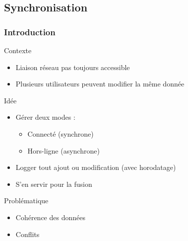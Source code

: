 \subsection{Synchronisation}

\begin{frame}
\tableofcontents[subsectionstyle=show/shaded/hide, sectionstyle=show/hide]
\end{frame}

\begin{frame}
\frametitle{Introduction}

\begin{block}{Contexte}
\begin{itemize}
    \item Liaison réseau pas toujours accessible
    \item Plusieurs utilisateurs peuvent modifier la même donnée
\end{itemize}
\end{block}

\pause

\begin{exampleblock}{Idée}
\begin{itemize}
    \item Gérer deux modes : 
    \begin{itemize}
        \item Connecté (synchrone)
        \item Hors-ligne (asynchrone)
    \end{itemize}
    \item Logger tout ajout ou modification (avec horodatage)
    \item S'en servir pour la fusion
\end{itemize}
\end{exampleblock}

\pause

\begin{alertblock}{Problématique}
\begin{itemize}
    \item Cohérence des données
    \item Conflits
\end{itemize}
\end{alertblock}

\end{frame} %

